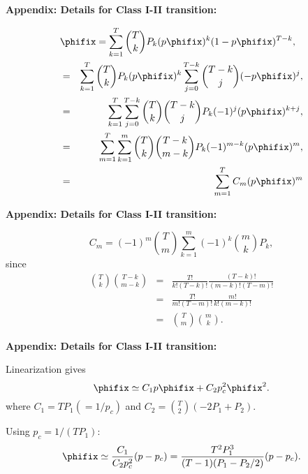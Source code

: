   \textbf{Appendix: Details for Class I-II transition:}

  \begin{eqnarray*}
    \label{gcontlong.eq:transIcalc1}
    \lefteqn{\phifix 
      = 
      \sum_{k=1}^{T}
      \binom{T}{k}
      P_k
      (p\phifix)^{k}
      (1-p\phifix)^{T-k},
    }
    \nonumber \\
      & = & 
      \sum_{k=1}^{T}
      \binom{T}{k}
      P_k
      (p\phifix)^{k}
      \sum_{j=0}^{T-k}
      \binom{T-k}{j}
      (-p\phifix)^{j},
      \nonumber \\
      & = & 
      \sum_{k=1}^{T}
      \sum_{j=0}^{T-k}
      \binom{T}{k}
      \binom{T-k}{j}
      P_k
      (-1)^{j}(p\phifix)^{k+j},
      \nonumber \\
      & = &
      \sum_{m=1}^{T}
      \sum_{k=1}^{m}
      \binom{T}{k}
      \binom{T-k}{m-k}
      P_k
      (-1)^{m-k}
      (p\phifix)^{m},
      \nonumber \\
      & = & 
      \sum_{m=1}^{T}
      C_m
      (p\phifix)^{m}
      \nonumber \\
  \end{eqnarray*}



  \textbf{Appendix: Details for Class I-II transition:}

  $$
  C_m = 
  (-1)^{m}
  \binom{T}{m}
  \sum_{k=1}^{m}
  (-1)^{k}
  \binom{m}{k}
  P_k,
  $$
  since 
  \begin{eqnarray*}
    \label{gcontlong.eq:ckcalc}  
    \binom{T}{k} \binom{T-k}{m-k}
    & = &
    \frac{T!}{k!(T-k)!}
    \frac{(T-k)!}{(m-k)!(T-m)!}
    \nonumber  \\
    & = & 
    \frac{T!}{m!(T-m)!}
    \frac{m!}{k!(m-k)!}
    \nonumber \\
    & = &
    \binom{T}{m} \binom{m}{k}.
  \end{eqnarray*}


  \textbf{Appendix: Details for Class I-II transition:}

  
  
    Linearization gives
    \begin{equation*}
      \label{gcontlong.eq:transIcalc2}
      \phifix
      \simeq
      C_1 p \phifix
      + C_2 p_c^2 \phifix^2.
    \end{equation*}
    where $C_1 = T P_1 (= 1/p_c)$ 
    and $C_2 = \binom{T}{2}(-2P_1 + P_2)$.
  
    Using $p_c = 1/(TP_1)$:
    \begin{equation*}
      \label{gcontlong.eq:transIcalc3}
      \phifix 
      \simeq
      \frac{C_1}{C_2 p_c^2} (p-p_c)
      =
      \frac{T^2 P_1^3}{(T-1)(P_1 - P_2/2)} (p-p_c).
    \end{equation*}
  
